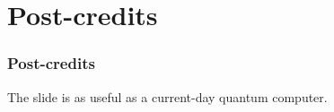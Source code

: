 \documentclass[notes]{beamer}
\begin{document}
\section{Post-credits}

\begin{frame}[noframenumbering]
\frametitle{Post-credits}
The slide is as useful as a current-day quantum computer.
\end{frame}

\end{document}
